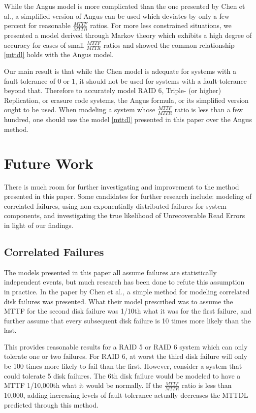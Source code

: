 \documentclass[XXX,endnotes]{usetex-v1}
\begin{document}
While the Angus model is more complicated than the one presented by Chen et al., a simplified version of Angus can be used which deviates by only a few percent for reasonable $\frac{MTTF}{MTTR}$ ratios. For more less constrained situations, we presented a model derived through Markov theory which exhibits a high degree of accuracy for cases of small $\frac{MTTF}{MTTR}$ ratios and showed the common relationship \eqref{mttdl} holds with the Angus model.

Our main result is that while the Chen model is adequate for systems with a fault tolerance of 0 or 1, it should not be used for systems with a fault-tolerance beyond that.  Therefore to accurately model RAID 6, Triple- (or higher) Replication, or erasure code systems, the Angus formula, or its simplified version ought to be used.  When modeling a system whose $\frac{MTTF}{MTTR}$ ratio is less than a few hundred, one should use the model \eqref{mttdl} presented in this paper over the Angus method.

\section{Future Work}

There is much room for further investigating and improvement to the method presented in this paper.  Some candidates for further research include: modeling of correlated failures, using non-exponentially distributed failures for system components, and investigating the true likelihood of Unrecoverable Read Errors in light of our findings.

\subsection{Correlated Failures}

The models presented in this paper all assume failures are statistically independent events, but much research has been done to refute this assumption in practice\cite{weibull}.  In the paper by Chen et al., a simple method for modeling correlated disk failures was presented\cite{reliability}.  What their model prescribed was to assume the MTTF for the second disk failure was 1/10th what it was for the first failure, and further assume that every subsequent disk failure is 10 times more likely than the last.

This provides reasonable results for a RAID 5 or RAID 6 system which can only tolerate one or two failures.  For RAID 6, at worst the third disk failure will only be 100 times more likely to fail than the first.  However, consider a system that could tolerate 5 disk failures.  The 6th disk failure would be modeled to have a MTTF 1/10,000th what it would be normally.  If the $\frac{MTTF}{MTTR}$ ratio is less than 10,000, adding increasing levels of fault-tolerance actually decreases the MTTDL predicted through this method.
\end{document}
